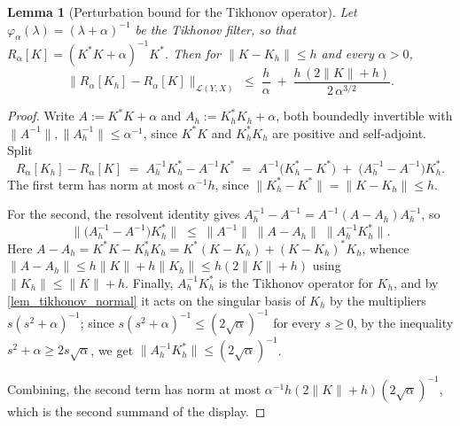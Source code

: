 \documentclass[a4paper]{report}
\theoremstyle{plain}
\newtheorem{lemma}[theorem]{Lemma}
\theoremstyle{definition}
\theoremstyle{remark}
\newcommand{\Ll}{\mathcal{L}}
\begin{document}
\begin{lemma}[Perturbation bound for the Tikhonov operator]
  \label{lem_tikhonov_operator_perturbation}
  Let $\varphi_{\alpha}(\lambda) = (\lambda+\alpha)^{-1}$ be the Tikhonov filter, so that
  $R_{\alpha}[K] = (K^{*}K+\alpha)^{-1}K^{*}$.  Then for $\|K-K_h\| \le h$ and every
  $\alpha > 0$,
  \[
    \bigl\|R_{\alpha}[K_h] - R_{\alpha}[K]\bigr\|_{\Ll(Y,X)}
      \;\le\; \frac{h}{\alpha} \;+\; \frac{h\,(2\|K\|+h)}{2\,\alpha^{3/2}} .
  \]
\end{lemma}
\begin{proof}
  Write $A := K^{*}K+\alpha$ and $A_h := K_h^{*}K_h+\alpha$, both boundedly invertible
  with $\|A^{-1}\|,\|A_h^{-1}\| \le \alpha^{-1}$, since $K^{*}K$ and $K_h^{*}K_h$ are
  positive and self-adjoint.  Split
  \[
    R_{\alpha}[K_h]-R_{\alpha}[K]
      \;=\; A_h^{-1}K_h^{*} - A^{-1}K^{*}
      \;=\; A^{-1}\bigl(K_h^{*}-K^{*}\bigr)
        \;+\; \bigl(A_h^{-1}-A^{-1}\bigr)K_h^{*} .
  \]
  The first term has norm at most $\alpha^{-1}h$, since
  $\|K_h^{*}-K^{*}\| = \|K-K_h\| \le h$.

  For the second, the resolvent identity gives
  $A_h^{-1}-A^{-1} = A^{-1}(A-A_h)A_h^{-1}$, so
  \[
    \bigl\|\bigl(A_h^{-1}-A^{-1}\bigr)K_h^{*}\bigr\|
      \;\le\; \|A^{-1}\|\;\|A-A_h\|\;\bigl\|A_h^{-1}K_h^{*}\bigr\| .
  \]
  Here $A-A_h = K^{*}K-K_h^{*}K_h = K^{*}(K-K_h) + (K-K_h)^{*}K_h$, whence
  $\|A-A_h\| \le h\|K\| + h\|K_h\| \le h(2\|K\|+h)$ using
  $\|K_h\| \le \|K\|+h$.  Finally, $A_h^{-1}K_h^{*}$ is the Tikhonov operator for $K_h$,
  and by \cref{lem_tikhonov_normal} it acts on the singular basis of $K_h$ by the
  multipliers $s(s^{2}+\alpha)^{-1}$; since $s(s^{2}+\alpha)^{-1} \le
  (2\sqrt{\alpha})^{-1}$ for every $s \ge 0$, by the inequality
  $s^{2}+\alpha \ge 2s\sqrt{\alpha}$, we get
  $\|A_h^{-1}K_h^{*}\| \le (2\sqrt{\alpha})^{-1}$.

  Combining, the second term has norm at most
  $\alpha^{-1}h(2\|K\|+h)(2\sqrt{\alpha})^{-1}$, which is the second summand of the
  display.
\end{proof}
\end{document}
